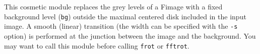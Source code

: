 This cosmetic module replaces the grey levels of a Fimage with 
a fixed background level (\verb+bg+)
outside the maximal centered disk included in
the input image. A smooth (linear) transition (the width can be specified with
the \verb+-s+ option) is performed at the junction
between the image and the background.
You may want to call this module before calling \verb+frot+ or \verb+fftrot+.


